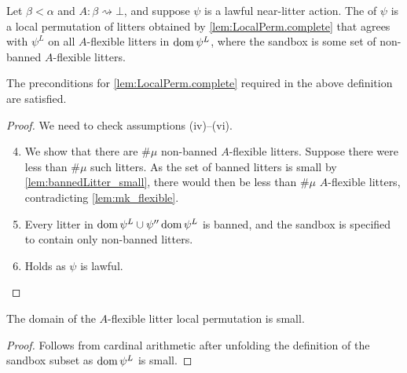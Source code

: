 \begin{definition}
    Let \( \beta < \alpha \) and \( A : \beta \rightsquigarrow \bot \), and suppose \( \psi \) is a lawful near-litter action.
    The  of \( \psi \) is a local permutation of litters obtained by \cref{lem:LocalPerm.complete} that agrees with \( \psi^L \) on all \( A \)-flexible litters in \( \operatorname{dom} \psi^L \), where the sandbox is some set of non-banned \( A \)-flexible litters.
\end{definition}
\begin{lemma}
    The preconditions for \cref{lem:LocalPerm.complete} required in the above definition are satisfied.
\end{lemma}
\begin{proof}
    We need to check assumptions (iv)--(vi).
    \begin{enumerate}
        \setcounter{enumi}{3}
        \item We show that there are \( \#\mu \) non-banned \( A \)-flexible litters.
        Suppose there were less than \( \#\mu \) such litters.
        As the set of banned litters is small by \cref{lem:bannedLitter_small}, there would then be less than \( \#\mu \) \( A \)-flexible litters, contradicting \cref{lem:mk_flexible}.
        \item Every litter in \( \operatorname{dom} \psi^L \cup \psi '' \operatorname{dom} \psi^L \) is banned, and the sandbox is specified to contain only non-banned litters.
        \item Holds as \( \psi \) is lawful.
    \end{enumerate}
\end{proof}
\begin{lemma}
    \label{lem:dom_flexibleLitterLocalPerm_small}
    The domain of the \( A \)-flexible litter local permutation is small.
\end{lemma}
\begin{proof}
    Follows from cardinal arithmetic after unfolding the definition of the sandbox subset as \( \operatorname{dom} \psi^L \) is small.
\end{proof}
